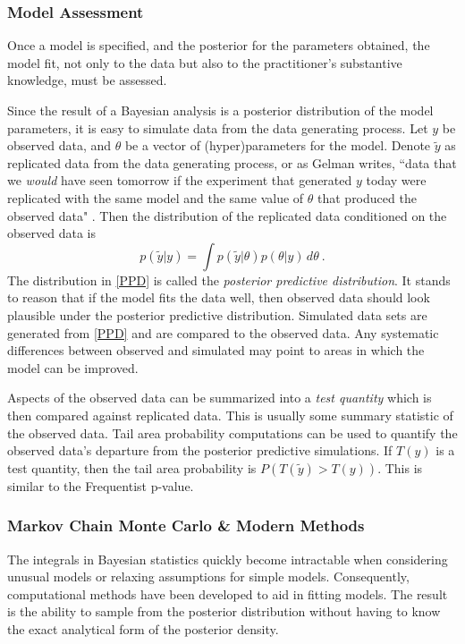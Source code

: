 \subsubsection{Model Assessment}

Once a model is specified, and the posterior for the parameters obtained, the model fit, not only to the data but also to the practitioner's substantive knowledge, must be assessed.  

Since the result of a Bayesian analysis is a posterior distribution of the model parameters, it is easy to simulate data from the data generating process.  Let $ y $ be observed data, and $ \theta $ be a vector of (hyper)parameters for the model.  Denote $ \tilde{y} $ as replicated data from the data generating process, or as Gelman writes, ``data that we \textit{would} have seen tomorrow if the experiment that generated $ y $ today were replicated with the same model and the same value of $ \theta $ that produced the observed data" \cite[page~145]{gelman2013bayesian}.  Then the distribution of the replicated data conditioned on the observed data is 
%
\begin{equation}\label{PPD}
	p(\tilde{y} \vert y) = \int p(\tilde{y} \vert \theta) p(\theta \vert y) \, d\theta  \>.
\end{equation}
%
The distribution in \cref{PPD} is called the \textit{posterior predictive distribution}.  It stands to reason that if the model fits the data well, then observed data should look plausible under the posterior predictive distribution.  Simulated data sets are generated from \cref{PPD} and are compared to the observed data.  Any systematic differences between observed and simulated may point to areas in which the model can be improved.

Aspects of the observed data can be summarized into a \textit{test quantity} which is then compared against replicated data. This is usually some summary statistic of the observed data. Tail area probability computations can be used to quantify  the observed data's departure from the posterior predictive simulations.  If $ T(y) $ is a test quantity, then the tail area probability is $ P(T(\tilde{y}) > T(y) ) $.  This is similar to the Frequentist p-value.


\subsubsection{Markov Chain Monte Carlo \& Modern Methods}

The integrals in Bayesian statistics quickly become intractable when considering unusual models or relaxing assumptions for simple models.  Consequently, computational methods have been developed to aid in fitting models.  The result is the ability to sample from the posterior distribution without having to know the exact analytical form of the posterior density.

